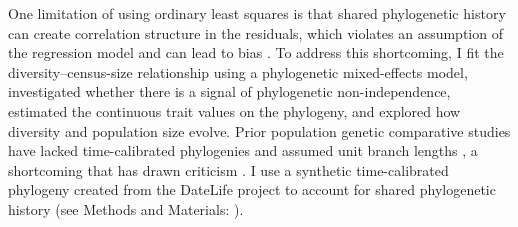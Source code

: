 \documentclass[9pt,lineno]{elife}
\begin{document}
One limitation of using ordinary least squares is that shared phylogenetic
history can create correlation structure in the residuals, which violates an
assumption of the regression model and can lead to bias
\citep{Felsenstein1985-an,Revell2010-mf}. To address this shortcoming, I fit
the diversity--census-size relationship using a phylogenetic mixed-effects
model, investigated whether there is a signal of phylogenetic non-independence,
estimated the continuous trait values on the phylogeny, and explored how
diversity and population size evolve. Prior population genetic comparative
studies have lacked time-calibrated phylogenies and assumed unit branch lengths
\citep{Whitney2010-ud}, a shortcoming that has drawn criticism
\citep{Lynch2011-qv}.  I use a synthetic time-calibrated phylogeny created from
the DateLife project \citep{OMeara2020-ds} to account for shared phylogenetic
history (see Methods and Materials: ).
\end{document}
